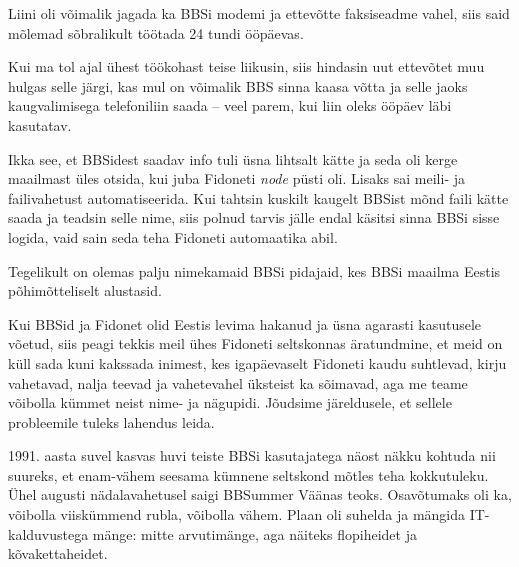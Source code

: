 Liini oli võimalik jagada ka BBSi modemi ja ettevõtte faksiseadme vahel, siis said
mõlemad sõbralikult töötada 24 tundi ööpäevas.

Kui ma tol ajal ühest töökohast teise liikusin, siis hindasin
uut ettevõtet muu hulgas selle järgi, kas mul on võimalik 
BBS sinna kaasa võtta ja selle jaoks 
kaugvalimisega telefoniliin saada – veel parem, kui liin oleks ööpäev läbi kasutatav.


Ikka see, et BBSidest saadav info tuli üsna lihtsalt kätte ja seda oli kerge maailmast üles otsida, kui juba Fidoneti \emph{node} püsti 
oli. Lisaks sai meili- ja 
failivahetust automatiseerida. Kui tahtsin kuskilt kaugelt BBSist mõnd 
faili kätte saada ja teadsin selle nime, siis polnud tarvis jälle endal käsitsi 
sinna BBSi sisse logida, vaid sain seda teha 
Fidoneti automaatika abil.


Tegelikult on olemas palju nimekamaid 
BBSi pidajaid, kes BBSi maailma Eestis põhimõtteliselt alustasid.

Kui BBSid ja Fidonet olid Eestis 
levima hakanud ja üsna agarasti kasutusele võetud, siis peagi tekkis meil 
ühes Fidoneti seltskonnas äratundmine, et meid on 
küll sada kuni kakssada inimest, kes igapäevaselt Fidoneti 
kaudu suhtlevad, kirju vahetavad, nalja teevad ja vahetevahel üksteist ka sõimavad, aga me teame võibolla kümmet neist nime- ja nägupidi. Jõudsime
järeldusele, et sellele probleemile tuleks lahendus leida. 

1991. aasta suvel kasvas huvi teiste BBSi kasutajatega näost näkku kohtuda nii suureks, 
et enam-vähem seesama kümnene seltskond mõtles teha kokkutuleku. Ühel augusti nädalavahetusel saigi BBSummer Väänas teoks. Osavõtumaks oli ka, 
võibolla viiskümmend rubla, võibolla vähem. Plaan oli suhelda ja mängida 
IT-kalduvustega mänge: mitte arvutimänge, aga näiteks flopiheidet ja 
kõvakettaheidet. 

